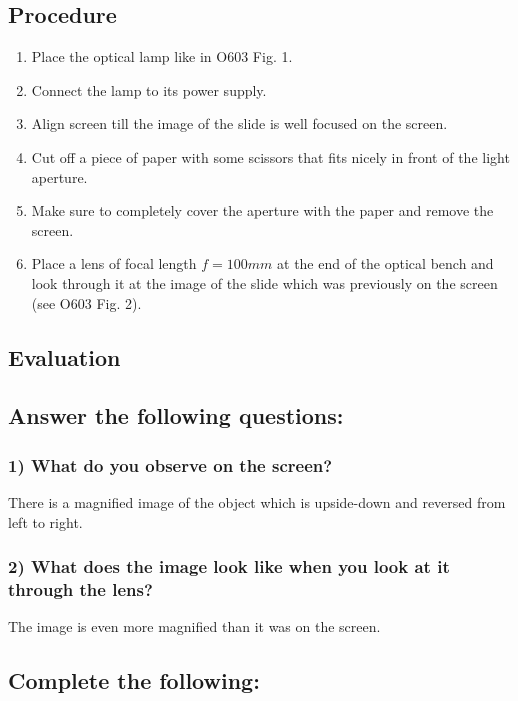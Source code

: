 \documentclass[12pt]{article}
\begin{document}
\subsection*{Procedure}

\begin{enumerate}
\item Place the optical lamp like in O603 Fig. 1.
\item Connect the lamp to its power supply.
\item Align screen till the image of the slide is well focused on the screen.
\item Cut off a piece of paper with some scissors that fits nicely in front of the light aperture.
\item Make sure to completely cover the aperture with the paper and remove the screen.
\item Place a lens of focal length $f=100mm$ at the end of the optical bench and look through it at the image of the slide which was previously on the screen (see O603 Fig. 2).
\end{enumerate}

\subsection*{Evaluation}


\subsection*{Answer the following questions:}

\subsubsection*{1) What do you observe on the screen?}

There is a magnified image of the object which is upside-down and reversed from left to
right.

\subsubsection*{2) What does the image look like when you look at it through the lens?}

The image is even more magnified than it was on the screen.

\subsection*{Complete the following:}
\end{document}
